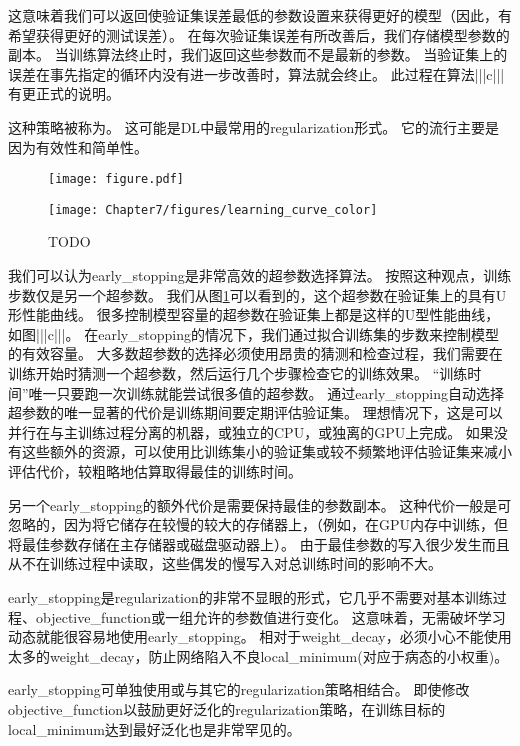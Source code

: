 这意味着我们可以返回使验证集误差最低的参数设置来获得更好的模型（因此，有希望获得更好的测试误差）。
在每次验证集误差有所改善后，我们存储模型参数的副本。
当训练算法终止时，我们返回这些参数而不是最新的参数。
当验证集上的误差在事先指定的循环内没有进一步改善时，算法就会终止。
此过程在算法|||c|||有更正式的说明。


这种策略被称为。
这可能是\gls{DL}中最常用的\gls{regularization}形式。
它的流行主要是因为有效性和简单性。

\begin{figure}[!htb]
\ifOpenSource
\centerline{\texttt{[image: figure.pdf]}}
\else
\centerline{\texttt{[image: Chapter7/figures/learning\_curve\_color]}}
\fi
\caption{TODO}
\label{fig:chap7_learning_curve_color}
\end{figure}

我们可以认为\gls{early_stopping}是非常高效的超参数选择算法。
按照这种观点，训练步数仅是另一个超参数。
我们从图\ref{fig:chap7_learning_curve_color}可以看到的，这个超参数在验证集上的具有U形性能曲线。
很多控制模型容量的超参数在验证集上都是这样的U型性能曲线，如图|||c|||。
在\gls{early_stopping}的情况下，我们通过拟合训练集的步数来控制模型的有效容量。
大多数超参数的选择必须使用昂贵的猜测和检查过程，我们需要在训练开始时猜测一个超参数，然后运行几个步骤检查它的训练效果。
``训练时间''唯一只要跑一次训练就能尝试很多值的超参数。
通过\gls{early_stopping}自动选择超参数的唯一显著的代价是训练期间要定期评估验证集。
理想情况下，这是可以并行在与主训练过程分离的机器，或独立的CPU，或独离的GPU上完成。
如果没有这些额外的资源，可以使用比训练集小的验证集或较不频繁地评估验证集来减小评估代价，较粗略地估算取得最佳的训练时间。

另一个\gls{early_stopping}的额外代价是需要保持最佳的参数副本。
这种代价一般是可忽略的，因为将它储存在较慢的较大的存储器上，（例如，在GPU内存中训练，但将最佳参数存储在主存储器或磁盘驱动器上）。
由于最佳参数的写入很少发生而且从不在训练过程中读取，这些偶发的慢写入对总训练时间的影响不大。


\gls{early_stopping}是\gls{regularization}的非常不显眼的形式，它几乎不需要对基本训练过程、\gls{objective_function}或一组允许的参数值进行变化。
这意味着，无需破坏学习动态就能很容易地使用\gls{early_stopping}。
相对于\gls{weight_decay}，必须小心不能使用太多的\gls{weight_decay}，防止网络陷入不良\gls{local_minimum}(对应于病态的小权重)。

\gls{early_stopping}可单独使用或与其它的\gls{regularization}策略相结合。
即使修改\gls{objective_function}以鼓励更好泛化的\gls{regularization}策略，在训练目标的\gls{local_minimum}达到最好泛化也是非常罕见的。

